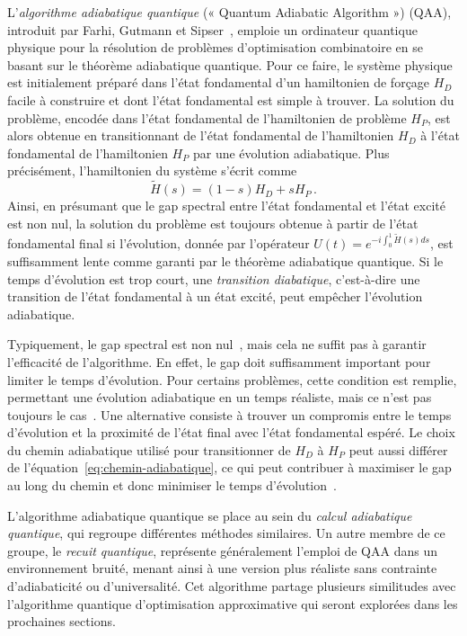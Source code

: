 L'\textit{algorithme adiabatique quantique} (« Quantum Adiabatic Algorithm ») (QAA), introduit par Farhi, Gutmann et Sipser~\cite{farhiQuantumComputationAdiabatic2000}, emploie un ordinateur quantique physique pour la résolution de problèmes d'optimisation combinatoire en se basant sur le théorème adiabatique quantique. Pour ce faire, le système physique est initialement préparé dans l'état fondamental d'un hamiltonien de forçage $H_{D}$ facile à construire et dont l'état fondamental est simple à trouver. La solution du problème, encodée dans l'état fondamental de l'hamiltonien de problème $H_{P}$, est alors obtenue en transitionnant de l'état fondamental de l'hamiltonien $H_{D}$ à l'état fondamental de l'hamiltonien $H_{P}$ par une évolution adiabatique. Plus précisément, l'hamiltonien du système s'écrit comme
\begin{equation}
\label{eq:chemin-adiabatique}    
    \tilde{H}(s) = \left(1-s\right) H_{D} + s H_{P} \,.
\end{equation}
Ainsi, en présumant que le gap spectral entre l'état fondamental et l'état excité est non nul, la solution du problème est toujours obtenue à partir de l'état fondamental final si l'évolution, donnée par l'opérateur $U(t) = e^{-i \int_{0}^{1} \tilde{H}(s) ds}$, est suffisamment lente comme garanti par le théorème adiabatique quantique. Si le temps d'évolution est trop court, une \textit{transition diabatique}, c'est-à-dire une transition de l'état fondamental à un état excité, peut empêcher l'évolution adiabatique.

Typiquement, le gap spectral est non nul~\cite{farhiQuantumComputationAdiabatic2000}, mais cela ne suffit pas à garantir l'efficacité de l'algorithme. En effet, le gap doit suffisamment important pour limiter le temps d'évolution. Pour certains problèmes, cette condition est remplie, permettant une évolution adiabatique en un temps réaliste, mais ce n'est pas toujours le cas~\cite{altshulerAndersonLocalizationMakes2010}. Une alternative consiste à trouver un compromis entre le temps d'évolution et la proximité de l'état final avec l'état fondamental espéré. Le choix du chemin adiabatique utilisé pour transitionner de $H_{D}$ à $H_{P}$ peut aussi différer de l'équation~\ref{eq:chemin-adiabatique}, ce qui peut contribuer à maximiser le gap au long du chemin et donc minimiser le temps d'évolution~\cite{nishimoriExponentialEnhancementEfficiency2017, hormoziNonstoquasticHamiltoniansQuantum2017}.

L'algorithme adiabatique quantique se place au sein du \textit{calcul adiabatique quantique}, qui regroupe différentes méthodes similaires. Un autre membre de ce groupe, le \textit{recuit quantique}, représente généralement l'emploi de QAA dans un environnement bruité, menant ainsi à une version plus réaliste sans contrainte d'adiabaticité ou d'universalité. Cet algorithme partage plusieurs similitudes avec l'algorithme quantique d'optimisation approximative qui seront explorées dans les prochaines sections. 

